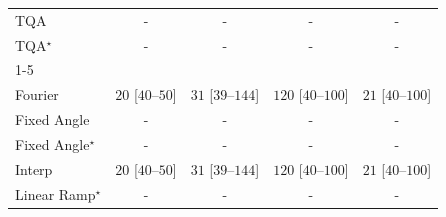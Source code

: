 \begin{tabular}{l|cccc|}
TQA & {\cellcolor[HTML]{000000}} \color[HTML]{F1F1F1} {\cellcolor{white}} \color{black} - & {\cellcolor[HTML]{000000}} \color[HTML]{F1F1F1} {\cellcolor{white}} \color{black} - & {\cellcolor[HTML]{000000}} \color[HTML]{F1F1F1} {\cellcolor{white}} \color{black} - & {\cellcolor[HTML]{000000}} \color[HTML]{F1F1F1} {\cellcolor{white}} \color{black} - \\
TQA$^\star$ & {\cellcolor[HTML]{000000}} \color[HTML]{F1F1F1} {\cellcolor{white}} \color{black} - & {\cellcolor[HTML]{000000}} \color[HTML]{F1F1F1} {\cellcolor{white}} \color{black} - & {\cellcolor[HTML]{000000}} \color[HTML]{F1F1F1} {\cellcolor{white}} \color{black} - & {\cellcolor[HTML]{000000}} \color[HTML]{F1F1F1} {\cellcolor{white}} \color{black} - \\
\cline{1-5}
\multicolumn{5}{c}{\rule{0pt}{8pt}PP} \\
\midrule
Fourier & {\cellcolor[HTML]{F5FBF3}} \color[HTML]{000000} $20$ [$40$--$50$] & {\cellcolor[HTML]{F3FAF0}} \color[HTML]{000000} $31$ [$39$--$144$] & {\cellcolor[HTML]{DCF2D7}} \color[HTML]{000000} $120$ [$40$--$100$] & {\cellcolor[HTML]{F5FBF2}} \color[HTML]{000000} $21$ [$40$--$100$] \\
Fixed Angle & {\cellcolor[HTML]{000000}} \color[HTML]{F1F1F1} {\cellcolor{white}} \color{black} - & {\cellcolor[HTML]{000000}} \color[HTML]{F1F1F1} {\cellcolor{white}} \color{black} - & {\cellcolor[HTML]{000000}} \color[HTML]{F1F1F1} {\cellcolor{white}} \color{black} - & {\cellcolor[HTML]{000000}} \color[HTML]{F1F1F1} {\cellcolor{white}} \color{black} - \\
Fixed Angle$^\star$ & {\cellcolor[HTML]{000000}} \color[HTML]{F1F1F1} {\cellcolor{white}} \color{black} - & {\cellcolor[HTML]{000000}} \color[HTML]{F1F1F1} {\cellcolor{white}} \color{black} - & {\cellcolor[HTML]{000000}} \color[HTML]{F1F1F1} {\cellcolor{white}} \color{black} - & {\cellcolor[HTML]{000000}} \color[HTML]{F1F1F1} {\cellcolor{white}} \color{black} - \\
Interp & {\cellcolor[HTML]{F5FBF3}} \color[HTML]{000000} $20$ [$40$--$50$] & {\cellcolor[HTML]{F3FAF0}} \color[HTML]{000000} $31$ [$39$--$144$] & {\cellcolor[HTML]{DCF2D7}} \color[HTML]{000000} $120$ [$40$--$100$] & {\cellcolor[HTML]{F5FBF2}} \color[HTML]{000000} $21$ [$40$--$100$] \\
Linear Ramp$^\star$ & {\cellcolor[HTML]{000000}} \color[HTML]{F1F1F1} {\cellcolor{white}} \color{black} - & {\cellcolor[HTML]{000000}} \color[HTML]{F1F1F1} {\cellcolor{white}} \color{black} - & {\cellcolor[HTML]{000000}} \color[HTML]{F1F1F1} {\cellcolor{white}} \color{black} - & {\cellcolor[HTML]{000000}} \color[HTML]{F1F1F1} {\cellcolor{white}} \color{black} - \\

\end{tabular}
